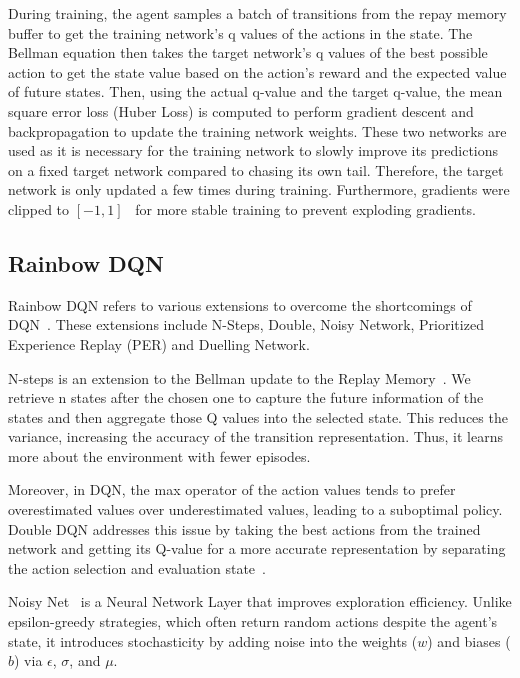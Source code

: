 \documentclass{article}
\begin{document}
During training, the agent samples a batch of transitions from the repay memory buffer to get the training network's q values of the actions in the state.
The Bellman equation then takes the target network's q values of the best possible action to get the state value based on the action's reward and the expected value of future states.
Then, using the actual q-value and the target q-value, the mean square error loss (Huber Loss) is computed to perform gradient descent and backpropagation to update the training network weights.
These two networks are used as it is necessary for the training network to slowly improve its predictions on a fixed target network compared to chasing its own tail.
Therefore, the target network is only updated a few times during training.
Furthermore, gradients were clipped to \([-1,1]\)~\cite{mnih_human-level_2015} for more stable training to prevent exploding gradients.

\subsection{Rainbow DQN}

Rainbow DQN refers to various extensions to overcome the shortcomings of DQN~\cite{hessel_rainbow_2017}.
These extensions include N-Steps, Double, Noisy Network, Prioritized Experience Replay (PER) and Duelling Network.

N-steps is an extension to the Bellman update to the Replay Memory~\cite{garcia_understanding_2019}.
We retrieve n states after the chosen one to capture the future information of the states and then aggregate those Q values into the selected state.
This reduces the variance, increasing the accuracy of the transition representation. Thus, it learns more about the environment with fewer episodes.

Moreover, in DQN, the max operator of the action values tends to prefer overestimated values over underestimated values, leading to a suboptimal policy.
Double DQN addresses this issue by taking the best actions from the trained network and getting its Q-value for a more accurate representation by separating the action selection and evaluation state~\cite{hasselt_deep_2015}.

Noisy Net~\cite{fortunato_noisy_2019} is a Neural Network Layer that improves exploration efficiency. Unlike epsilon-greedy strategies, which often return random actions despite the agent’s state, it introduces stochasticity by adding noise into the weights ($w$) and biases ($b$) via $\epsilon$, $\sigma$, and $\mu$.
\end{document}
